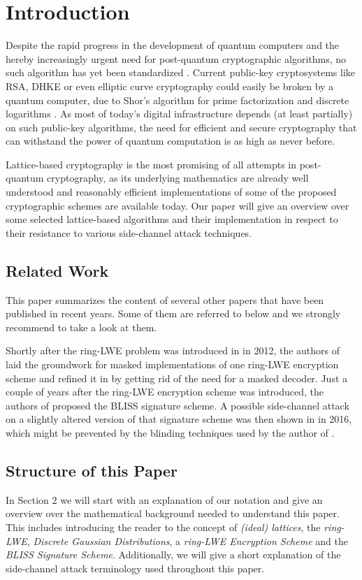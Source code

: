 \chapter{Introduction}
Despite the rapid progress in the development of quantum computers and the hereby increasingly urgent need for post-quantum cryptographic algorithms, no such algorithm has yet been standardized \cite{Nist}. Current public-key cryptosystems like RSA, DHKE or even elliptic curve cryptography could easily be broken by a quantum computer, due to Shor's algorithm for prime factorization and discrete logarithms \cite{Shor}. As most of today's digital infrastructure depends (at least partially) on such public-key algorithms, the need for efficient and secure cryptography that can withstand the power of quantum computation is as high as never before.

Lattice-based cryptography is the most promising of all attempts in post-quantum cryptography, as its underlying mathematics are already well understood and reasonably efficient implementations of some of the proposed cryptographic schemes are available today. Our paper will give an overview over some selected lattice-based algorithms and their implementation in respect to their resistance to various side-channel attack techniques.

\section{Related Work}
This paper summarizes the content of several other papers that have been published in recent years. Some of them are referred to below and we strongly recommend to take a look at them.

Shortly after the \acs{ring-LWE} problem was introduced in \cite{cryptoeprint:2012:230} in 2012, the authors of \cite{maskedRing} laid the groundwork for masked implementations of one \acs{ring-LWE} encryption scheme and refined it in \cite{Reparaz2016} by getting rid of the need for a masked decoder. Just a couple of years after the \acs{ring-LWE} encryption scheme was introduced, the authors of \cite{bliss} proposed the BLISS signature scheme. A possible side-channel attack on a slightly altered version of that signature scheme was then shown in \cite{cryptoeprint:2016:300} in 2016, which might be prevented by the blinding techniques used by the author of \cite{cryptoeprint:2016:276}.

\section{Structure of this Paper}
In Section 2 we will start with an explanation of our notation and give an overview over the mathematical background needed to understand this paper. This includes introducing the reader to the concept of \textit{(ideal) lattices}, the \textit{\ac{ring-LWE}}, \textit{Discrete Gaussian Distributions}, a \textit{\ac{ring-LWE} Encryption Scheme} and the \textit{BLISS Signature Scheme}. Additionally, we will give a short explanation of the side-channel attack terminology used throughout this paper.

